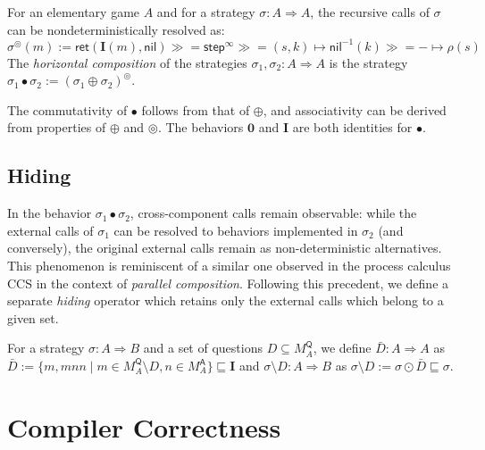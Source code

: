 \documentclass[acmsmall,timestamp,review,anonymous]{acmart}
\newcommand{\kw}[1]{\ensuremath{ \mathsf{#1} }}
\newcommand{\bind}{\gg\!\!=}
\begin{document}
\begin{definition}
For an elementary game $A$
and for a strategy $\sigma : A \Rightarrow A$,
the recursive calls of $\sigma$ can be nondeterministically resolved as:
\[
\sigma^\circledcirc(m) :=
  \kw{ret}(\mathbf{I}(m), \kw{nil}) \bind 
      \kw{step}^\infty \bind
   (s, k) \mapsto
       \kw{nil}^{-1}(k) \bind - \mapsto
       \rho(s)
\]
The \emph{horizontal composition} of the strategies
$\sigma_1, \sigma_2 : A \Rightarrow A$
is the strategy
$
    \sigma_1 \bullet \sigma_2 :=
      (\sigma_1 \oplus \sigma_2)^\circledcirc
$.
\end{definition}

The commutativity of $\bullet$ follows from that of $\oplus$,
and associativity can be derived from properties of $\oplus$ and $\circledcirc$.
The behaviors $\mathbf{0}$ and $\mathbf{I}$
are both identities for $\bullet$.


\subsection{Hiding} %

In the behavior $\sigma_1 \bullet \sigma_2$,
cross-component calls remain observable:
while the external calls of $\sigma_1$
can be resolved to behaviors implemented in $\sigma_2$
(and conversely),
the original external calls remain
as non-deterministic alternatives.
This phenomenon is reminiscent of a similar one observed
in the process calculus CCS \cite{ccs}
in the context of \emph{parallel composition}.
Following this precedent,
we define a separate \emph{hiding} operator
which retains only the external calls
which belong to a given set.

\begin{definition}[Hiding]
For a strategy $\sigma : A \Rightarrow B$ and
a set of questions $D \subseteq M_A^\kw{Q}$,
we define $\bar{D} : A \Rightarrow A$ as
$\bar{D} := \{ m, mnn \mid m \in M_A^\kw{Q} \setminus D, n \in M_A^\kw{A} \}
\sqsubseteq \mathbf{I}$
and $\sigma \setminus D : A \Rightarrow B$ as
$\sigma \setminus D := \sigma \odot \bar{D} \sqsubseteq \sigma$.
\end{definition}



\section{Compiler Correctness} \label{sec:compcert} %
\end{document}
